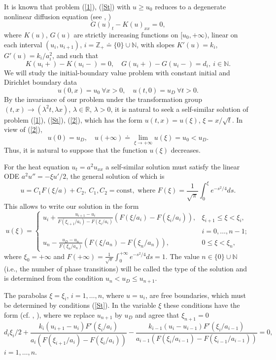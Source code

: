 \documentclass[10pt,a4paper]{amsart}
\numberwithin{equation}{section}
\newcommand{\R}{{\mathbb R}}
\newcommand{\N}{{\mathbb N}}
\newcommand{\Z}{{\mathbb Z}}
\newcommand{\const}{\mathrm{const}}
\begin{document}
It is known that problem (\ref{1}), (\ref{St}) with $u\ge u_0$ reduces to a degenerate nonlinear diffusion  equation (see \cite{Kam}, \cite[Chapter 5]{LSU})
\begin{equation}\label{diff}
G(u)_t-K(u)_{xx}=0,
\end{equation}
where $K(u)$, $G(u)$ are strictly increasing functions on $[u_0,+\infty)$, linear on each interval $(u_i,u_{i+1})$,
$i=\Z_+\doteq\{0\}\cup\N$, with slopes $K'(u)=k_i$, $G'(u)=k_i/a_i^2$, and such that
\[
K(u_i+)-K(u_i-)=0, \quad G(u_i+)-G(u_i-)=d_i, \ i\in\N.
\]
We will study the initial-boundary value problem with constant initial and Dirichlet boundary data
\begin{equation}\label{2}
u(0,x)=u_0 \ \forall x>0, \quad u(t,0)=u_D \ \forall t>0.
\end{equation}
By the invariance of our problem under the transformation group
$(t,x)\to (\lambda^2 t, \lambda x)$, $\lambda\in\R$, $\lambda>0$, it is natural to seek a self-similar solution of problem (\ref{1}), (\ref{St}), (\ref{2}), which has the form $u(t,x)=u(\xi)$, $\xi=x/\sqrt{t}$. In view of (\ref{2}),
\[u(0)=u_D, \quad u(+\infty)\doteq\lim_{\xi\to+\infty} u(\xi)=u_0<u_D.\]
Thus, it is natural to suppose that the function $u(\xi)$ decreases.

For the heat equation
$u_t=a^2 u_{xx}$ a self-similar solution must satisfy the linear ODE $a^2u''=-\xi u'/2$, the general solution of which is
\[
u=C_1F(\xi/a)+C_2, \ C_1,C_2=\const, \mbox{ where } F(\xi)=\frac{1}{\sqrt{\pi}}\int_0^\xi e^{-s^2/4}ds.
\]
This allows to write our solution in the form
\begin{equation}\label{3}
u(\xi)=\left\{\begin{array}{lr} u_i+\frac{u_{i+1}-u_i}{F(\xi_{i+1}/a_i)-F(\xi_i/a_i)}(F(\xi/a_i)-F(\xi_i/a_i)), &
\xi_{i+1}\le\xi<\xi_i, \\ & i=0,\ldots,n-1; \\
u_n-\frac{u_D-u_n}{F(\xi_n/a_n)}(F(\xi/a_n)-F(\xi_n/a_n)), & 0\le\xi<\xi_n,
\end{array}\right.
\end{equation}
where $\xi_0=+\infty$ and $\displaystyle F(+\infty)=\frac{1}{\sqrt{\pi}}\int_0^{+\infty} e^{-s^2/4}ds=1$.
The value $n\in\{0\}\cup\N$ (i.e., the number of phase transitions) will be called the type of the solution and is determined from the condition $u_n<u_D\le u_{n+1}$.

The parabolas $\xi=\xi_i$, $i=1,\ldots,n$, where $u=u_i$, are free boundaries, which must be determined by conditions (\ref{St}).
In the variable $\xi$ these conditions have the form (cf. \cite[Chapter XI]{CJ}, \cite{Wil}), where we replace $u_{n+1}$ by $u_D$ and agree that $\xi_{n+1}=0$
\begin{equation}\label{4}
d_i\xi_i/2+\frac{k_i(u_{i+1}-u_i)F'(\xi_i/a_i)}{a_i(F(\xi_{i+1}/a_i)-F(\xi_i/a_i))}-
\frac{k_{i-1}(u_i-u_{i-1})F'(\xi_i/a_{i-1})}{a_{i-1}(F(\xi_i/a_{i-1})-F(\xi_{i-1}/a_{i-1}))}=0,
\end{equation}
$i=1,\ldots,n$.
\end{document}
